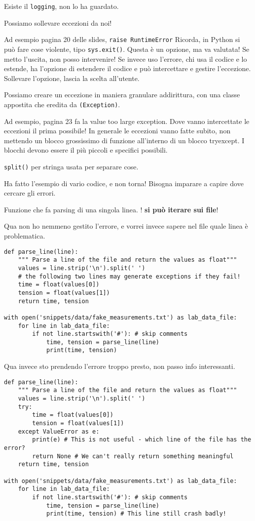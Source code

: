\documentclass[10pt, a4paper, titlepage]{book}
\begin{document}
Esiste il \texttt{logging}, non lo ha guardato.

Possiamo sollevare eccezioni da noi!

Ad esempio pagina 20 delle slides, \texttt{raise RuntimeError}
Ricorda, in Python si può fare cose violente, tipo \texttt{sys.exit()}. Questa è un opzione, ma va valutata! Se metto l'uscita, non posso intervenire! Se invece uso l'errore, chi usa il codice e lo estende, ha l'opzione di estendere il codice e può intercettare e gestire l'eccezione. Sollevare l'opzione, lascia la scelta all'utente.

Possiamo creare un eccezione in maniera granulare addirittura, con una classe appostita che eredita da \texttt{(Exception)}.

Ad esempio, pagina 23 fa la value too large exception.
Dove vanno intercettate le eccezioni il prima possibile!
In generale le eccezioni vanno fatte subito, non mettendo un blocco grossissimo di funzione all'interno di un blocco tryexcept. I blocchi devono essere il più piccoli e specifici possibili.

\texttt{split()} per stringa usata per separare cose.

Ha fatto l'esempio di vario codice, e non torna! Bisogna imparare a capire dove cercare gli errori.

Funzione che fa parsing di una singola linea. ! \textbf{si può iterare sui file}!

Qua non ho nemmeno gestito l'errore, e vorrei invece sapere nel file quale linea è problematica.

\begin{verbatim}
def parse_line(line):
	""" Parse a line of the file and return the values as float"""
	values = line.strip('\n').split(' ')
	# the following two lines may generate exceptions if they fail!
	time = float(values[0])
	tension = float(values[1])
	return time, tension

with open('snippets/data/fake_measurements.txt') as lab_data_file:
	for line in lab_data_file:
		if not line.startswith('#'): # skip comments
			time, tension = parse_line(line)
			print(time, tension)
\end{verbatim}

Qua invece sto prendendo l'errore troppo presto, non passo info interessanti.

\begin{verbatim}
def parse_line(line):
	""" Parse a line of the file and return the values as float"""
	values = line.strip('\n').split(' ')
	try:
		time = float(values[0])
		tension = float(values[1])
	except ValueError as e:
		print(e) # This is not useful - which line of the file has the error?
		return None # We can't really return something meaningful
	return time, tension

with open('snippets/data/fake_measurements.txt') as lab_data_file:
	for line in lab_data_file:
		if not line.startswith('#'): # skip comments
			time, tension = parse_line(line)
			print(time, tension) # This line still crash badly!
\end{verbatim}
\end{document}
